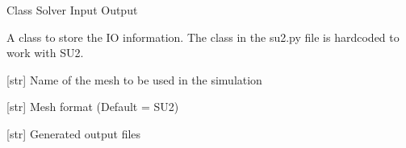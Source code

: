 \documentclass[letterpaper,10pt,english]{sphinxmanual}
\begin{document}
\begin{fulllineitems}
\label{\detokenize{modules:su2.Solver_Input_Output}}
\pysigstartsignatures
{}
\pysigstopsignatures
\sphinxAtStartPar
Class Solver Input Output

\sphinxAtStartPar
A class to store the IO information.
The class in the su2.py file is hardcoded to work with SU2.

\begin{fulllineitems}
\label{\detokenize{modules:su2.Solver_Input_Output.mesh_filename}}
\pysigstartsignatures
{}
\pysigstopsignatures
\sphinxAtStartPar
{[}str{]} Name of the mesh to be used in the simulation

\end{fulllineitems}


\begin{fulllineitems}
\label{\detokenize{modules:su2.Solver_Input_Output.mesh_format}}
\pysigstartsignatures
{}
\pysigstopsignatures
\sphinxAtStartPar
{[}str{]} Mesh format (Default = SU2)

\end{fulllineitems}


\begin{fulllineitems}
\label{\detokenize{modules:su2.Solver_Input_Output.output_files}}
\pysigstartsignatures
{}
\pysigstopsignatures
\sphinxAtStartPar
{[}str{]} Generated output files

\end{fulllineitems}



\end{fulllineitems}
\end{document}
